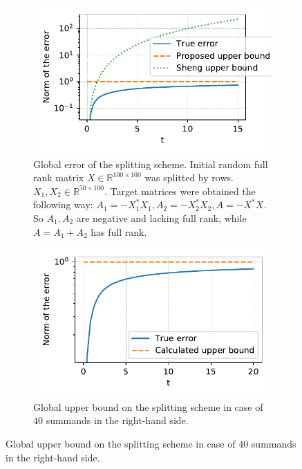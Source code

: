 \documentclass{article}
\begin{document}
\begin{figure}[h!]
    \begin{subfigure}[t]{0.49\textwidth}
            \centering
            \includegraphics[width=\linewidth]{upper_bound_2.pdf}
            \caption{{\small Global error of the splitting scheme. Initial random full rank matrix $X \in \mathbb{R}^{100 \times 100}$ was splitted by rows. $X_1, X_2 \in \mathbb{R}^{50 \times 100}$. Target matrices were obtained the following way: $A_1 = -X_1^*X_1, A_2 = -X_2^*X_2, A = -X^*X$. So $A_1, A_2$ are negative and lacking full rank, while $A = A_1 + A_2$ has full rank.}}
            \label{strang:fig:upper_bound_2}
    \end{subfigure}%
    \hfill
    \begin{subfigure}[t]{0.49\textwidth}
            \centering
            \includegraphics[width=\linewidth]{upper_bound_many.pdf}
            \caption{{\small Global upper bound on the splitting scheme in case of $40$ summands in the right-hand side.}}
            \label{strang:fig:upper_bound_many}
    \end{subfigure}
\end{figure}
\end{document}
